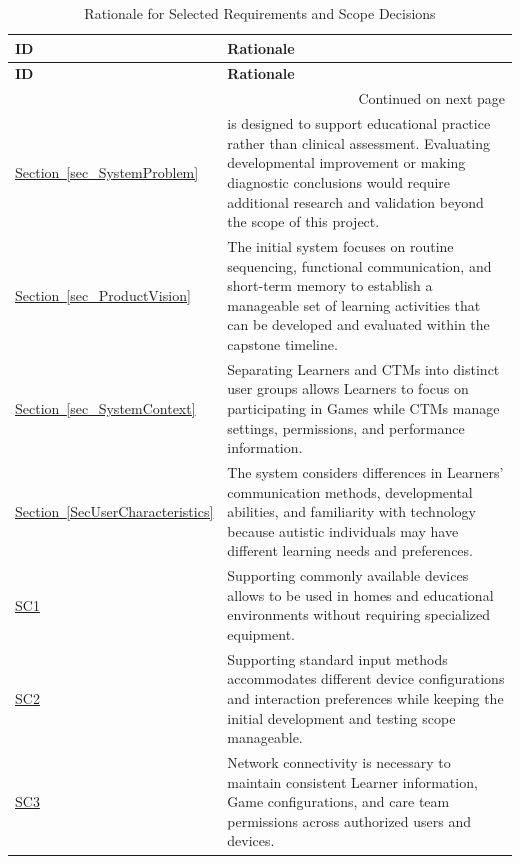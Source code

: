 \documentclass[12pt]{article}
\begin{document}
\begin{longtable}{@{}p{}p{}@{}}
\caption{Rationale for Selected Requirements and Scope Decisions}
\label{tab:Rationale}\\
\toprule
\textbf{ID} & \textbf{Rationale}\\
\midrule
\endfirsthead
\toprule
\textbf{ID} & \textbf{Rationale}\\
\midrule
\endhead
\midrule
\multicolumn{2}{r}{Continued on next page}\\
\endfoot
\bottomrule
\endlastfoot
\hyperref[sec_SystemProblem]{Section~\ref*{sec_SystemProblem}} &
\progname{} is designed to support educational practice rather than clinical
assessment. Evaluating developmental improvement or making diagnostic
conclusions would require additional research and validation beyond the scope of
this project.\\
\addlinespace
\hyperref[sec_ProductVision]{Section~\ref*{sec_ProductVision}} &
The initial system focuses on routine sequencing, functional communication, and
short-term memory to establish a manageable set of learning activities that can
be developed and evaluated within the capstone timeline.\\
\addlinespace
\hyperref[sec_SystemContext]{Section~\ref*{sec_SystemContext}} &
Separating Learners and CTMs into distinct user groups allows Learners to focus
on participating in Games while CTMs manage settings, permissions, and
performance information.\\
\addlinespace
\hyperref[SecUserCharacteristics]{Section~\ref*{SecUserCharacteristics}} &
The system considers differences in Learners' communication methods,
developmental abilities, and familiarity with technology because autistic
individuals may have different learning needs and preferences.\\
\addlinespace
\hyperlink{SC1}{SC1} &
Supporting commonly available devices allows \progname{} to be used in homes and
educational environments without requiring specialized equipment.\\
\addlinespace
\hyperlink{SC2}{SC2} &
Supporting standard input methods accommodates different device configurations
and interaction preferences while keeping the initial development and testing
scope manageable.\\
\addlinespace
\hyperlink{SC3}{SC3} &
Network connectivity is necessary to maintain consistent Learner information,
Game configurations, and care team permissions across authorized users and
devices.\\
\end{longtable}
\end{document}
